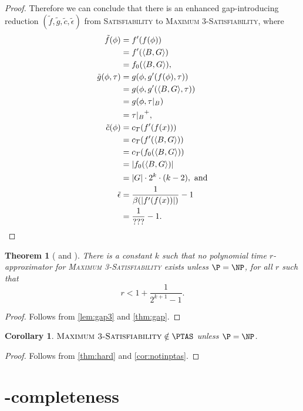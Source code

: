 \documentclass[]{article}
\theoremstyle{plain}
\newtheorem{corollary}{Corollary}
\newtheorem{theorem}{Theorem}
\theoremstyle{definition}
\newcommand{\pair}[2]{{\left\langle{#1}, {#2}\right\rangle}}
\begin{document}
\begin{proof}
  Therefore we can conclude that there is an enhanced gap-introducing reduction $(\tilde{f}, \tilde{g}, \tilde{c}, \tilde{\epsilon})$ from \textsc{Satisfiability} to \textsc{Maximum 3-Satisfiability}, where
  \begin{align*}
    \tilde{f}(\phi) & = f'(f(\phi)) \\
    & = f'(\pair{B}{G}) \\
    & = f_0(\pair{B}{G}), \\
    \tilde{g}(\phi, \tau) & = g(\phi, g'(f(\phi), \tau)) \\
    & = g(\phi, g'(\pair{B}{G}, \tau)) \\
    & = g(\phi, \tau|_B) \\
    & = {\tau|_B}^+, \\
    \tilde{c}(\phi) & = c_T(f'(f(x))) \\
    & = c_T(f'(\pair{B}{G})) \\
    & = c_T(f_0(\pair{B}{G})) \\
    & = |f_0(\pair{B}{G})| \\
    & = |G| \cdot 2^k \cdot (k - 2), \text{ and} \\
    \tilde{\epsilon} & = \frac{1}{\beta(|f'(f(x))|)} - 1 \\
    & = \frac{1}{???} - 1. \qedhere
  \end{align*}
\end{proof}

\begin{theorem}[{\cite[Theorem~6.3]{book}} and {\cite[Corollary~29.8]{vazirani}}]\label{thm:hard}
  There is a constant $k$ such that no polynomial time $r$-approximator for \textsc{Maximum 3-Satisfiability} exists unless $\P = \NP$, for all $r$ such that
  \begin{displaymath}
    r < 1 + \frac{1}{2^{k + 1} - 1}.
  \end{displaymath}
\end{theorem}
\begin{proof}
  Follows from \autoref{lem:gap3} and \autoref{thm:gap}.
\end{proof}

\begin{corollary}
  $\textsc{Maximum 3-Satisfiability} \notin \PTAS$ unless $\P = \NP$.
\end{corollary}
\begin{proof}
  Follows from \autoref{thm:hard} and \autoref{cor:notinptas}.
\end{proof}

\section{\texorpdfstring{\APX}{APX}-completeness}
\end{document}
